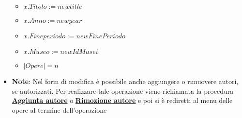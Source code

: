 \begin{itemize}
	\begin{itemize}
		\item $x.Titolo := newtitle$
		\item $x.Anno := newyear$
		\item $x.Fineperiodo := newFinePeriodo$
		\item $x.Museo := newIdMusei$
		\item $|Opere| = n$
	\end{itemize}
	\item \textbf{Note}:
	Nel form di modifica è possibile anche aggiungere o rimuovere autori, se autorizzati.
	Per realizzare tale operazione viene richiamata la procedura \hyperref[AggiuntaAutore]{\textbf{Aggiunta autore}}
	o \hyperref[RimozioneAutoreOpera]{\textbf{Rimozione autore}} e poi si è rediretti al
	menu delle opere al termine dell'operazione
\end{itemize}

